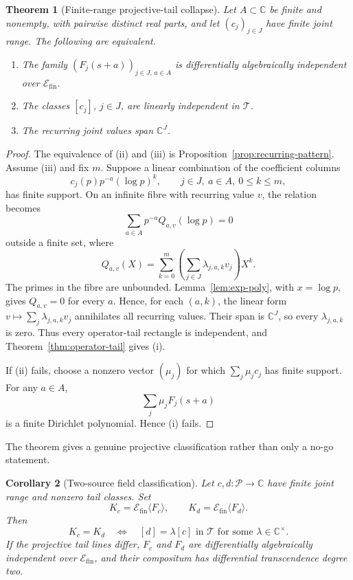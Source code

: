 \documentclass[11pt]{article}
\newtheorem{theorem}{Theorem}[section]
\newtheorem{corollary}[theorem]{Corollary}
\theoremstyle{definition}
\theoremstyle{remark}
\newcommand{\C}{\mathbb C}
\newcommand{\cP}{\mathcal P}
\newcommand{\cT}{\mathcal T}
\begin{document}
\begin{theorem}[Finite-range projective-tail collapse]
\label{thm:finite-range-collapse}
Let \(A\subset\C\) be finite and nonempty, with pairwise distinct real parts, and let
\((c_j)_{j\in J}\) have finite joint range.  The following are equivalent.
\begin{enumerate}[label=(\roman*),leftmargin=2.2em]
  \item The family \((F_j(s+a))_{j\in J,\,a\in A}\) is differentially algebraically
  independent over \(\mathscr E_{\mathrm{fin}}\).
  \item The classes \([c_j]\), \(j\in J\), are linearly independent in \(\cT\).
  \item The recurring joint values span \(\C^J\).
\end{enumerate}
\end{theorem}

\begin{proof}
The equivalence of (ii) and (iii) is Proposition~\ref{prop:recurring-pattern}.
Assume (iii) and fix \(m\).  Suppose a linear combination of the coefficient columns
\[
  c_j(p)p^{-a}(\log p)^k,
  \qquad j\in J,\ a\in A,\ 0\leq k\leq m,
\]
has finite support.  On an infinite fibre with recurring value \(v\), the relation becomes
\[
  \sum_{a\in A}p^{-a}Q_{a,v}(\log p)=0
\]
outside a finite set, where
\[
  Q_{a,v}(X)
  =
  \sum_{k=0}^m
    \left(\sum_{j\in J}\lambda_{j,a,k}v_j\right)X^k.
\]
The primes in the fibre are unbounded.  Lemma~\ref{lem:exp-poly}, with \(x=\log p\),
gives \(Q_{a,v}=0\) for every \(a\).  Hence, for each \((a,k)\), the linear form
\(v\mapsto\sum_j\lambda_{j,a,k}v_j\) annihilates all recurring values.  Their span is
\(\C^J\), so every \(\lambda_{j,a,k}\) is zero.  Thus every operator-tail rectangle is
independent, and Theorem~\ref{thm:operator-tail} gives (i).

If (ii) fails, choose a nonzero vector \((\mu_j)\) for which
\(\sum_j\mu_jc_j\) has finite support.  For any \(a\in A\),
\[
  \sum_j\mu_jF_j(s+a)
\]
is a finite Dirichlet polynomial.  Hence (i) fails.
\end{proof}

The theorem gives a genuine projective classification rather than only a no-go statement.

\begin{corollary}[Two-source field classification]\label{cor:field-classification}
Let \(c,d:\cP\to\C\) have finite joint range and nonzero tail classes.  Set
\[
  K_c=\mathscr E_{\mathrm{fin}}\langle F_c\rangle,
  \qquad
  K_d=\mathscr E_{\mathrm{fin}}\langle F_d\rangle.
\]
Then
\[
  K_c=K_d
  \quad\Longleftrightarrow\quad
  [d]=\lambda[c]\text{ in }\cT
  \text{ for some }\lambda\in\C^\times.
\]
If the projective tail lines differ, \(F_c\) and \(F_d\) are differentially
algebraically independent over \(\mathscr E_{\mathrm{fin}}\), and their compositum has
differential transcendence degree two.
\end{corollary}
\end{document}
